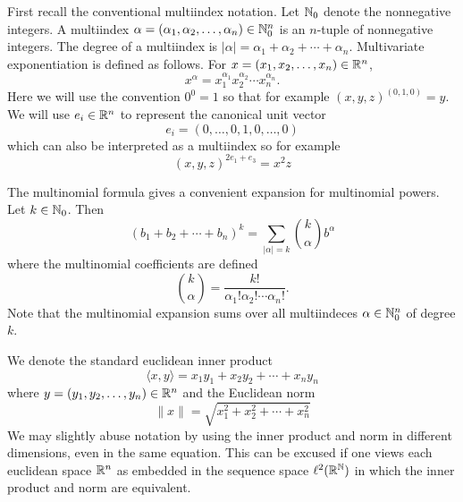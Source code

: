 \begin{notationpage}

\vskip 15mm

First recall the conventional multiindex notation. Let $\mathbb{N}_0$ denote the nonnegative integers. A multiindex $\alpha = (\alpha_1, \alpha_2, \ldots, \alpha_n) \in \mathbb{N}_0^n$ is an $n$-tuple of nonnegative integers. The degree of a multiindex is $|\alpha| = \alpha_1 + \alpha_2 + \cdots + \alpha_n$. Multivariate exponentiation is defined as follows. For $x = (x_1, x_2, \ldots, x_n) \in \mathbb{R}^n$,
\[
  x^\alpha = x_1^{\alpha_1}x_2^{\alpha_2} \cdots x_n^{\alpha_n}.
\]
Here we will use the convention $0^0 = 1$ so that for example ${(x, y, z)}^{(0, 1, 0)} = y$. We will use $e_i \in \mathbb{R}^n$ to represent the canonical unit vector
\[
  e_i = (0, \ldots, 0, 1, 0, \ldots, 0)
\]
which can also be interpreted as a multiindex so for example
\[
  (x,y,z)^{2e_1 + e_3} = x^2z
\]

The multinomial formula gives a convenient expansion for multinomial powers. Let $k \in \mathbb{N}_0$. Then
\[
  {(b_1 + b_2 + \cdots + b_n)}^k = \sum_{|\alpha| = k} \binom{k}{\alpha} b^\alpha
\] 
where the multinomial coefficients are defined
\[
  \binom{k}{\alpha} = \frac{k!}{\alpha_1! \alpha_2! \cdots \alpha_n!}.
\]
Note that the multinomial expansion sums over all multiindeces $\alpha \in \mathbb{N}_0^n$ of degree $k$.

We denote the standard euclidean inner product
\[
  \langle x,y \rangle = x_1y_1 + x_2y_2 + \cdots + x_n y_n
\]
where $y = (y_1, y_2, \ldots, y_n) \in \mathbb{R}^n$ and the Euclidean norm 
\[
  \|x\| = \sqrt{x_1^2 + x_2^2 + \cdots + x_n^2}
\]
We may slightly abuse notation by using the inner product and norm in different dimensions, even in the same equation. This can be excused if one views each euclidean space $\mathbb{R}^n$ as embedded in the sequence space $\ell^2(\mathbb{R}^{\mathbb{N}})$ in which the inner product and norm are equivalent.


\end{notationpage}
